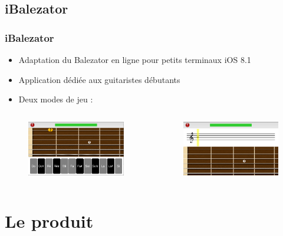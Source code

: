 \documentclass{beamer}
\begin{document}
	\subsection{iBalezator}
	\begin{frame}

		\frametitle{iBalezator}
		\begin{itemize}
			\item Adaptation du Balezator en ligne pour petits terminaux iOS 8.1
			\item Application dédiée aux guitaristes débutants
			\item Deux modes de jeu :
		\end{itemize}


		\begin{columns}

			 \begin{column}{0.5\textwidth}
				\begin{figure}
					\includegraphics[width=5cm]{images/clavier_question.png}
				\end{figure}

			\end{column}

			 \begin{column}{0.5\textwidth}
				\begin{figure}
					\includegraphics[width=5cm]{images/portee_first_question.png}
					
				\end{figure}
				
			\end{column}

		\end{columns} 
	\end{frame} 


\section{Le produit}
\end{document}
